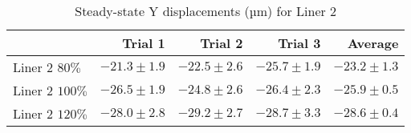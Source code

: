 \begin{table}[htbp!]
\centering
\begin{tabular}{lrrrr}
\toprule
  & Trial 1 & Trial 2 & Trial 3 & Average \\
\midrule
 Liner 2 $80\%$ & $-21.3 \pm 1.9$ & $-22.5 \pm 2.6$ & $-25.7 \pm 1.9$ & $-23.2 \pm 1.3$ \\
 Liner 2 $100\%$ & $-26.5 \pm 1.9$ & $-24.8 \pm 2.6$ & $-26.4 \pm 2.3$ & $-25.9 \pm 0.5$ \\
 Liner 2 $120\%$ & $-28.0 \pm 2.8$ & $-29.2 \pm 2.7$ & $-28.7 \pm 3.3$ & $-28.6 \pm 0.4$ \\
\bottomrule
\end{tabular}
\caption{Steady-state Y displacements (µm) for Liner 2}
\label{fig:liner_2_results_table}
\end{table}